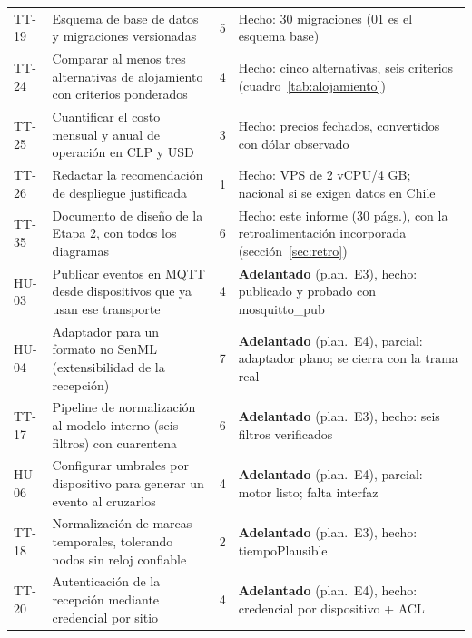 \begin{longtable}{@{}L{1.2cm}L{4.6cm}C{0.6cm}L{5.4cm}@{}}
TT-19 & Esquema de base de datos y migraciones versionadas & 5 & Hecho: 30 migraciones (01 es el esquema base) \\
TT-24 & Comparar al menos tres alternativas de alojamiento con criterios ponderados & 4 & Hecho: cinco alternativas, seis criterios (cuadro~\ref{tab:alojamiento}) \\
TT-25 & Cuantificar el costo mensual y anual de operación en CLP y USD & 3 & Hecho: precios fechados, convertidos con dólar observado \\
TT-26 & Redactar la recomendación de despliegue justificada & 1 & Hecho: VPS de 2 vCPU/4 GB; nacional si se exigen datos en Chile \\
TT-35 & Documento de diseño de la Etapa 2, con todos los diagramas & 6 & Hecho: este informe (30 págs.), con la retroalimentación incorporada (sección~\ref{sec:retro}) \\
HU-03 & Publicar eventos en MQTT desde dispositivos que ya usan ese transporte & 4 & \textbf{Adelantado} (plan.\ E3), hecho: publicado y probado con mosquitto\_pub \\
HU-04 & Adaptador para un formato no SenML (extensibilidad de la recepción) & 7 & \textbf{Adelantado} (plan.\ E4), parcial: adaptador plano; se cierra con la trama real \\
TT-17 & Pipeline de normalización al modelo interno (seis filtros) con cuarentena & 6 & \textbf{Adelantado} (plan.\ E3), hecho: seis filtros verificados \\
HU-06 & Configurar umbrales por dispositivo para generar un evento al cruzarlos & 4 & \textbf{Adelantado} (plan.\ E4), parcial: motor listo; falta interfaz \\
TT-18 & Normalización de marcas temporales, tolerando nodos sin reloj confiable & 2 & \textbf{Adelantado} (plan.\ E3), hecho: tiempoPlausible \\
TT-20 & Autenticación de la recepción mediante credencial por sitio & 4 & \textbf{Adelantado} (plan.\ E4), hecho: credencial por dispositivo + ACL \\
\end{longtable}


